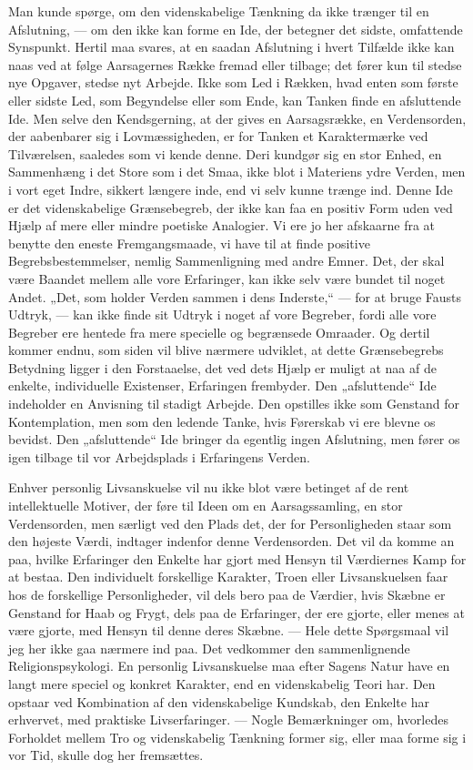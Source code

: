 \documentclass[12pt,a4paper]{article}
\newcommand{\opage}[1]{\marginnote{\footnotesize\textit{[#1]}}}
\begin{document}
Man kunde spørge, om den videnskabelige Tænkning da ikke trænger til en
Afslutning, --- om den ikke kan forme en Ide, der betegner det sidste,
omfattende Synspunkt. Hertil maa svares, at en saadan Afslutning i hvert
Tilfælde ikke kan naas ved at følge Aarsagernes Række fremad eller tilbage;
det fører kun til stedse nye Opgaver, stedse nyt Arbejde. Ikke som Led i
Rækken, hvad enten som første eller sidste Led, som Begyndelse eller som
Ende, kan Tanken finde en afsluttende Ide. Men selve den Kendsgerning, at
der gives en Aarsagsrække, en Verdensorden, der aabenbarer sig i
Lovmæssigheden, er for Tanken et Karaktermærke ved Tilværelsen, saaledes som
vi kende denne. Deri kundgør sig en stor Enhed, en Sammenhæng i det Store som
i det Smaa, ikke blot i Materiens ydre Verden, men i vort eget Indre, sikkert
længere inde, end vi selv kunne trænge ind. Denne Ide er det videnskabelige
Grænsebegreb, der ikke kan faa en positiv Form uden ved Hjælp af mere eller
mindre poetiske Analogier. Vi ere jo her afskaarne fra at benytte den eneste
Fremgangsmaade, vi have til at finde positive Begrebsbestemmelser, nemlig
Sammenligning med andre Emner. Det, der skal være Baandet mellem alle vore
Erfaringer, kan ikke selv være bundet til noget Andet. „Det, som holder
Verden sammen i dens Inderste,“ --- for at bruge Fausts Udtryk, --- kan ikke
finde sit Udtryk i noget af vore Begreber, fordi alle vore Begreber ere
hentede fra mere specielle og begrænsede Omraader. Og dertil kommer endnu,
som siden vil blive nærmere udviklet, at dette Grænsebegrebs Betydning ligger
i den Forstaaelse, det ved dets Hjælp er muligt at naa af de enkelte,
individuelle Existenser, Erfaringen frembyder. Den „afsluttende“ Ide
indeholder en Anvisning til stadigt Arbejde. Den opstilles ikke som \opage{35} Genstand
for Kontemplation, men som den ledende Tanke, hvis Førerskab vi ere blevne os
bevidst. Den „afsluttende“ Ide bringer da egentlig ingen Afslutning, men
fører os igen tilbage til vor Arbejdsplads i Erfaringens Verden.

Enhver personlig Livsanskuelse vil nu ikke blot være betinget af de rent
intellektuelle Motiver, der føre til Ideen om en Aarsagssamling, en stor
Verdensorden, men særligt ved den Plads det, der for Personligheden staar som
den højeste Værdi, indtager indenfor denne Verdensorden. Det vil da komme an
paa, hvilke Erfaringer den Enkelte har gjort med Hensyn til Værdiernes Kamp
for at bestaa. Den individuelt forskellige Karakter, Troen eller
Livsanskuelsen faar hos de forskellige Personligheder, vil dels bero paa de
Værdier, hvis Skæbne er Genstand for Haab og Frygt, dels paa de Erfaringer,
der ere gjorte, eller menes at være gjorte, med Hensyn til denne deres
Skæbne. --- Hele dette Spørgsmaal vil jeg her ikke gaa nærmere ind paa. Det
vedkommer den sammenlignende Religionspsykologi. En personlig Livsanskuelse
maa efter Sagens Natur have en langt mere speciel og konkret Karakter, end en
videnskabelig Teori har. Den opstaar ved Kombination af den videnskabelige
Kundskab, den Enkelte har erhvervet, med praktiske Livserfaringer. --- Nogle
Bemærkninger om, hvorledes Forholdet mellem Tro og videnskabelig Tænkning
former sig, eller maa forme sig i vor Tid, skulle dog her fremsættes.
\end{document}
